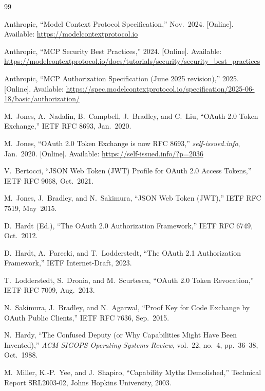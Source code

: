 \documentclass[journal]{IEEEtran}
\begin{document}
\begin{thebibliography}{99}

Anthropic, ``Model Context Protocol Specification,'' Nov.\ 2024.
[Online]. Available: \url{https://modelcontextprotocol.io}

Anthropic, ``MCP Security Best Practices,'' 2024.
[Online]. Available: \url{https://modelcontextprotocol.io/docs/tutorials/security/security_best_practices}

Anthropic, ``MCP Authorization Specification (June 2025 revision),'' 2025.
[Online]. Available: \url{https://spec.modelcontextprotocol.io/specification/2025-06-18/basic/authorization/}

M.\ Jones, A.\ Nadalin, B.\ Campbell, J.\ Bradley, and C.\ Liu,
``OAuth 2.0 Token Exchange,''
IETF RFC 8693, Jan.\ 2020.

M.\ Jones, ``OAuth 2.0 Token Exchange is now RFC 8693,''
\textit{self-issued.info}, Jan.\ 2020.
[Online]. Available: \url{https://self-issued.info/?p=2036}

V.\ Bertocci,
``JSON Web Token (JWT) Profile for OAuth 2.0 Access Tokens,''
IETF RFC 9068, Oct.\ 2021.

M.\ Jones, J.\ Bradley, and N.\ Sakimura,
``JSON Web Token (JWT),''
IETF RFC 7519, May\ 2015.

D.\ Hardt (Ed.),
``The OAuth 2.0 Authorization Framework,''
IETF RFC 6749, Oct.\ 2012.

D.\ Hardt, A.\ Parecki, and T.\ Lodderstedt,
``The OAuth 2.1 Authorization Framework,''
IETF Internet-Draft, 2023.

T.\ Lodderstedt, S.\ Dronia, and M.\ Scurtescu,
``OAuth 2.0 Token Revocation,''
IETF RFC 7009, Aug.\ 2013.

N.\ Sakimura, J.\ Bradley, and N.\ Agarwal,
``Proof Key for Code Exchange by OAuth Public Clients,''
IETF RFC 7636, Sep.\ 2015.

N.\ Hardy,
``The Confused Deputy (or Why Capabilities Might Have Been Invented),''
\textit{ACM SIGOPS Operating Systems Review},
vol.\ 22, no.\ 4, pp.\ 36--38, Oct.\ 1988.

M.\ Miller, K.-P.\ Yee, and J.\ Shapiro,
``Capability Myths Demolished,''
Technical Report SRL2003-02, Johns Hopkins University, 2003.


\end{thebibliography}
\end{document}
